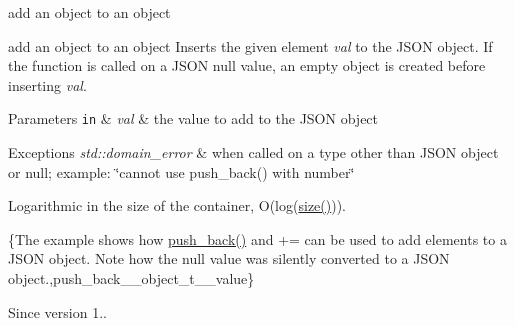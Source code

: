 add an object to an object 

add an object to an object Inserts the given element {\itshape val} to the J\+S\+ON object. If the function is called on a J\+S\+ON null value, an empty object is created before inserting {\itshape val}.


\begin{DoxyParams}[1]{Parameters}
\mbox{\tt in}  & {\em val} & the value to add to the J\+S\+ON object\\
\hline
\end{DoxyParams}

\begin{DoxyExceptions}{Exceptions}
{\em std\+::domain\+\_\+error} & when called on a type other than J\+S\+ON object or null; example\+: {\ttfamily \char`\"{}cannot use push\+\_\+back() with number\char`\"{}}\\
\hline
\end{DoxyExceptions}
Logarithmic in the size of the container, O(log({\ttfamily \hyperlink{classnlohmann_1_1basic__json_a0ea8a1ecca4b3cb0ba09ad7552c364b6}{size()}})).

\{The example shows how {\ttfamily \hyperlink{classnlohmann_1_1basic__json_a486b96adbf4886c38e38c952394a220f}{push\+\_\+back()}} and {\ttfamily +=} can be used to add elements to a J\+S\+ON object. Note how the {\ttfamily null} value was silently converted to a J\+S\+ON object.,push\+\_\+back\+\_\+\+\_\+object\+\_\+t\+\_\+\+\_\+value\}

\begin{DoxySince}{Since}
version 1.. 
\end{DoxySince}
\hypertarget{classnlohmann_1_1basic__json_aa0033766b4d3134b9bb57d81762d75a2}{}\label{classnlohmann_1_1basic__json_aa0033766b4d3134b9bb57d81762d75a2} 

